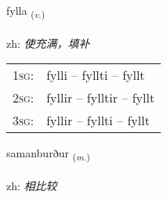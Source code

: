 \documentclass[frontgrid, backgrid]{flacards}\usepackage[]{graphicx}\usepackage[]{color}
\begin{document}
\renewcommand{\flhead}{\vskip5pt \fboxsep=0pt {\small\bfseries\footnotesize Sagnorð | 动词}}
\renewcommand{\fcfoot}{\vskip5pt \fboxsep=0pt \hspace{2pt}{\small\bfseries\footnotesize 2K}}

\renewcommand{\blhead}{\vskip5pt {\small\bfseries\footnotesize Sagnorð | 动词 }}
\renewcommand{\bcfoot}{\vskip5pt \hspace{2pt}{\small\bfseries\footnotesize 2K}}


{fylla \small{\textsubscript{(\textit{v.})}} \\[1ex] %
\textphonetic{[fɪtla]} \\
zh: \emph{使充满，填补} \\  [2ex]
\renewcommand*{\arraystretch}{0.8}
\begin{tabular}{p{1cm}l}
\textsc{1sg}: & fylli -- fyllti -- fyllt \\ 
\textsc{2sg}: & fyllir -- fylltir -- fyllt \\ 
\textsc{3sg}: & fyllir -- fyllti -- fyllt \\ 
\end{tabular}
}

\renewcommand{\flhead}{\vskip5pt \fboxsep=0pt {\small\bfseries\footnotesize Nafnorð | 名词}}
\renewcommand{\fcfoot}{\vskip5pt \fboxsep=0pt \hspace{2pt}{\small\bfseries\footnotesize 2K}}

\renewcommand{\blhead}{\vskip5pt {\small\bfseries\footnotesize Nafnorð | 名词 }}
\renewcommand{\bcfoot}{\vskip5pt \hspace{2pt}{\small\bfseries\footnotesize 2K}}


{samanburður \small{\textsubscript{(\textit{m.})}} \\[1ex] %
\textphonetic{[saːmanpʏrðʏr]} \\
zh: \emph{相比较} \\  [2ex]
\renewcommand*{\arraystretch}{0.8}
}
\end{document}
